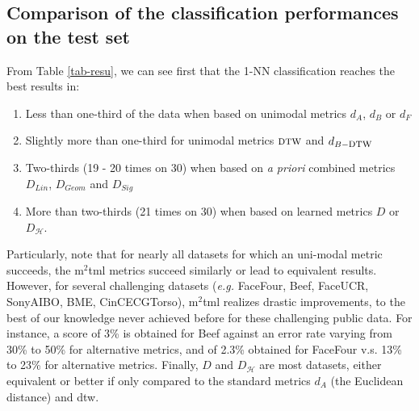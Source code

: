 \subsection{Comparison of the classification performances on the test set}
From Table \ref{tab-resu}, we can see first that the 1-NN classification reaches  the best results in: 
\begin{enumerate}
	\item Less than one-third of the data when based on unimodal metrics $d_A$, $d_B$ or $d_F$
	\item Slightly more than one-third for unimodal metrics $\mbox{\sc dtw}$ and $d_{B-\mbox{\sc dtw}}$ 
	\item Two-thirds (19 - 20 times on 30) when based on \textit{a priori} combined metrics $D_{Lin}$, $D_{Geom}$ and $D_{Sig}$
	\item More than two-thirds (21 times on 30)  when based on learned metrics $D$ or  $D_{\mathcal{H}}$.
\end{enumerate}
Particularly, note that for nearly all datasets for which an uni-modal metric succeeds,  the {\sc m}$^2${\sc tml} metrics succeed similarly or lead to equivalent results.  
However, for  several challenging datasets ({\it e.g.} FaceFour, Beef, FaceUCR, SonyAIBO, BME, CinCECGTorso), {\sc m}$^2${\sc tml} realizes drastic improvements, to the best of our knowledge never achieved before  for these challenging public data. For instance, a score of 3\% is obtained for Beef against an error rate  varying from 30\% to 50\% for alternative metrics, and of 2.3\% obtained for FaceFour  v.s. 13\% to 23\% for alternative metrics.  Finally, $D$ and $D_{\mathcal{H}}$ are most datasets, either equivalent or better if only compared to the standard metrics $d_A$ (the Euclidean distance) and {\sc dtw}. 


